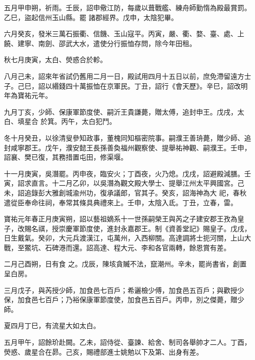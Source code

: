 \begin{pinyinscope}
 五月甲申朔，祈雨。壬辰，詔申儆江防，每歲以葺戰艦、練舟師勤惰為殿最賞罰。乙巳，盜起信州玉山縣。罷
 諸郡經界。戊申，太陰犯畢。



 六月癸亥，發米三萬石振衢、信饑、玉山寇平。丙寅，嚴、衢、婺、臺、處、上饒、建寧、南劍、邵武大水，遣使分行振恤存問，除今年田租。



 秋七月庚寅，太白、熒惑合於軫。



 八月己未，詔來年省試仍舊用二月一日，殿試用四月十五日以前，庶免滯留遠方士子。己巳，詔以緡錢四十萬振恤在京軍民。丁丑，詔行《會天歷》。辛巳，詔改明年為寶祐元年。



 九月丁亥，少師、保康軍節度使、嗣沂王貴謙薨，贈太傅，追封申王。戊戌，太白、填星合
 於箕。丙午，太白犯鬥。



 冬十月癸丑，以徐清叟參知政事，董槐同知樞密院事。嗣濮王善珘薨，贈少師、追封咸寧郡王。戊午，濮安懿王長孫善奐福州觀察使、提舉祐神觀、嗣濮王。壬申，詔襄、樊已復，其務措置屯田，修渠堰。



 十一月庚寅，吳潛罷。丙申夜，臨安火；丁酉夜，火乃熄。戊戌，詔避殿減膳。壬寅，詔求直言。十二月乙卯，以吳潛為觀文殿大學士、提舉江州太平興國宮。己未，詔追錄彭大雅創城渝州功，復承議郎，官其子。癸亥，詔海神為大
 祀，春秋遣從臣奉命往祠，奉常其條具典禮來上。壬申，太陰入氐。丁丑，立春，雷。



 寶祐元年春正月庚寅朔，詔以藝祖嫡系十一世孫嗣榮王與芮之子建安郡王孜為皇子，改賜名祺，授崇慶軍節度使，進封永嘉郡王。制《資善堂記》賜皇子。戊戌，日生戴氣。癸卯，大元兵渡漢江，屯萬州，入西柳關。高達調將士扼河關，上山大戰，至鱉坑、石碑港而還。詔高達、程大元、李和各官兩轉，餘恩賞有差。



 二月己酉朔，日有食
 之。戊辰，陳垓貪贓不法，竄潮州。辛未，罷尚書省，創置呈白房。



 三月戊子，與芮授少師，加食邑七百戶；希邐檢少傅，加食邑五百戶；與歡授少保，加食邑七百戶；乃裕保康軍節度使，加食邑五百戶。丙申，別之傑薨，贈少師。



 夏四月丁巳，有流星大如太白。



 五月甲午，詔餘玠赴闕。乙未，詔侍從、臺諫、給舍、制司各舉帥才二人。丁酉，熒惑、歲星合在昴。己亥，賜禮部進士姚勉以下及第、出身有差。




\end{pinyinscope}
